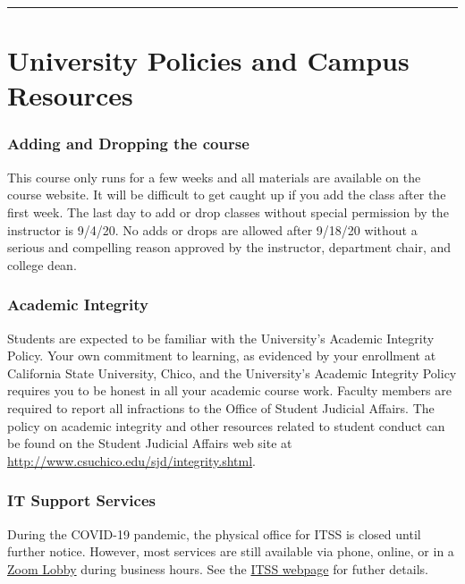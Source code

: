 \documentclass[
  11pt,
]{article}
\begin{document}
\begin{center}\rule{0.5\linewidth}{0.5pt}\end{center}

\hypertarget{university-policies-and-campus-resources}{%
\section{University Policies and Campus
Resources}\label{university-policies-and-campus-resources}}

\hypertarget{adding-and-dropping-the-course}{%
\subsubsection{Adding and Dropping the
course}\label{adding-and-dropping-the-course}}

This course only runs for a few weeks and all materials are available on
the course website. It will be difficult to get caught up if you add the
class after the first week. The last day to add or drop classes without
special permission by the instructor is 9/4/20. No adds or drops are
allowed after 9/18/20 without a serious and compelling reason approved
by the instructor, department chair, and college dean.

\hypertarget{academic-integrity}{%
\subsubsection{Academic Integrity}\label{academic-integrity}}

Students are expected to be familiar with the University's Academic
Integrity Policy. Your own commitment to learning, as evidenced by your
enrollment at California State University, Chico, and the University's
Academic Integrity Policy requires you to be honest in all your academic
course work. Faculty members are required to report all infractions to
the Office of Student Judicial Affairs. The policy on academic integrity
and other resources related to student conduct can be found on the
Student Judicial Affairs web site at
\url{http://www.csuchico.edu/sjd/integrity.shtml}.

\hypertarget{it-support-services}{%
\subsubsection{IT Support Services}\label{it-support-services}}

During the COVID-19 pandemic, the physical office for ITSS is closed
until further notice. However, most services are still available via
phone, online, or in a
\href{https://csuchico.zoom.us/j/5308984357?pwd=WUwwaXJQUTNPSnJqc1hTemxPY0ZiQT09}{Zoom
Lobby} during business hours. See the
\href{https://www.csuchico.edu/itss/}{ITSS webpage} for futher details.
\end{document}
